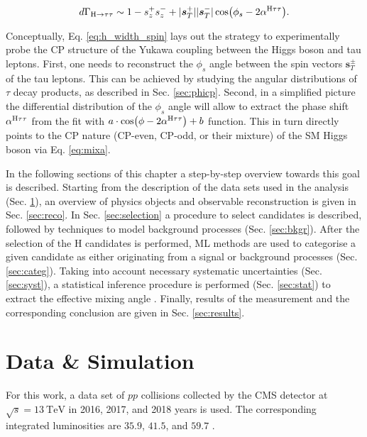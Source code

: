\begin{equation}\label{eq:h_width_spin}
    d\Gamma_{\text{H} \rightarrow \tau\tau} \sim 1 - s^+_zs^-_z + |\boldsymbol{s}_T^+||\boldsymbol{s}_T^-|\cos(\phi_{s}-2\alpha^{\text{H}\tau\tau}).
\end{equation}

Conceptually, Eq. \ref{eq:h_width_spin} lays out the strategy to experimentally probe the CP structure of the Yukawa coupling between the Higgs boson and tau leptons. First, one needs to reconstruct the $\phi_{s}$ angle between the spin vectors $\boldsymbol{s}_T^\pm$ of the tau leptons. This can be achieved by studying the angular distributions of $\tau$ decay products, as described in Sec. \ref{sec:phicp}. Second, in a simplified picture the differential distribution of the $\phi_{s}$ angle will allow to extract the phase shift $\alpha^{\text{H}\tau\tau}$ from the fit with $a\cdot\cos(\phi - 2\alpha^{\text{H}\tau\tau})+b$ function. This in turn directly points to the CP nature (CP-even, CP-odd, or their mixture) of the SM Higgs boson via Eq. \ref{eq:mixa}. 

In the following sections of this chapter a step-by-step overview towards this goal is described. Starting from the description of the data sets used in the analysis (Sec. \ref{sec:samples}), an overview of physics objects and observable reconstruction is given in Sec. \ref{sec:reco}. In Sec. \ref{sec:selection} a procedure to select \htt candidates is described, followed by techniques to model background processes (Sec. \ref{sec:bkgr}). After the selection of the H candidates is performed, ML methods are used to categorise a given candidate as either originating from a signal or background processes (Sec. \ref{sec:categ}). Taking into account necessary systematic uncertainties (Sec. \ref{sec:syst}), a statistical inference procedure is performed (Sec. \ref{sec:stat}) to extract the effective mixing angle \mixa. Finally, results of the measurement and the corresponding conclusion are given in Sec. \ref{sec:results}. 

\section{Data \& Simulation}\label{sec:samples}

For this work, a data set of $pp$ collisions collected by the CMS detector at $\sqrt{s}=13~\text{TeV}$ in 2016, 2017, and 2018 years is used. The corresponding integrated luminosities are $35.9$, $41.5$, and $59.7$ \fbi.

